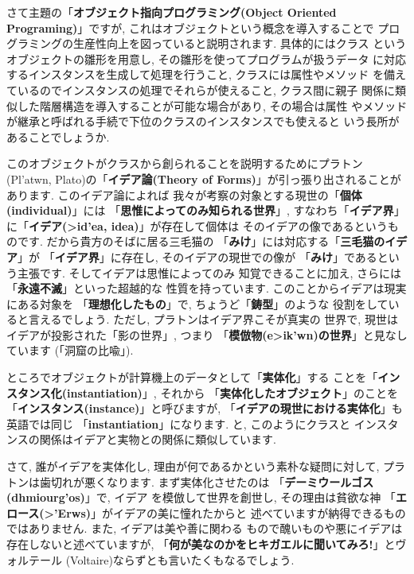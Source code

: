 さて主題の「\textbf{オブジェクト指向プログラミング(Object Oriented
 Programing)}」ですが, これはオブジェクトという概念を導入することで
プログラミングの生産性向上を図っていると説明されます. 具体的にはクラス
というオブジェクトの雛形を用意し, その雛形を使ってプログラムが扱うデータ
に対応するインスタンスを生成して処理を行うこと, クラスには属性やメソッド
を備えているのでインスタンスの処理でそれらが使えること, クラス間に親子
関係に類似した階層構造を導入することが可能な場合があり, その場合は属性
やメソッドが継承と呼ばれる手続で下位のクラスのインスタンスでも使えると
いう長所があることでしょうか.
\newline


このオブジェクトがクラスから創られることを説明するためにプラトン
(\textgreek{Pl'atwn}, Plato)の「\textbf{イデア論(Theory
 of Forms)}」が引っ張り出されることがあります. このイデア論によれば
我々が考察の対象とする現世の「\textbf{個体(individual)}」には
「\textbf{思惟によってのみ知られる世界}」, すなわち「\textbf{イデア界}」
に「\textbf{イデア(\textgreek{>id'ea}, idea)}」が存在して個体は
そのイデアの像であるというものです. だから貴方のそばに居る三毛猫の
「\textbf{みけ}」には対応する「\textbf{三毛猫のイデア}」が
「\textbf{イデア界}」に存在し, そのイデアの現世での像が
「\textbf{みけ}」であるという主張です. そしてイデアは思惟によってのみ
知覚できることに加え, さらには「\textbf{永遠不滅}」といった超越的な
性質を持っています. このことからイデアは現実にある対象を
「\textbf{理想化したもの}」で, ちょうど「\textbf{鋳型}」のような
役割をしていると言えるでしょう. ただし, プラトンはイデア界こそが真実の
世界で, 現世はイデアが投影された「影の世界」, つまり
「\textbf{模倣物(\textgreek{e>ik'wn})の世界}」と見なしています
(「洞窟の比喩」\cite{国家}).
\newline


ところでオブジェクトが計算機上のデータとして「\textbf{実体化}」する
ことを「\textbf{インスタンス化(instantiation)}」, それから
「\textbf{実体化したオブジェクト}」のことを
「\textbf{インスタンス(instance)}」と呼びますが, 
「\textbf{イデアの現世における実体化}」も英語では同じ
「\textbf{instantiation}」になります. と, このようにクラスと
インスタンスの関係はイデアと実物との関係に類似しています. 
\newline

さて, 誰がイデアを実体化し, 理由が何であるかという素朴な疑問に対して,
 プラトンは歯切れが悪くなります. まず実体化させたのは
 「\textbf{デーミウールゴス(\textgreek{dhmiourg'os})}」で, イデア
を模倣して世界を創世し, その理由は貧欲な神
「\textbf{エロース(\textgreek{>'Erws})}」がイデアの美に憧れたからと
述べていますが納得できるものではありません. また, イデアは美や善に関わる
もので醜いものや悪にイデアは存在しないと述べていますが,
 「\textbf{何が美なのかをヒキガエルに聞いてみろ!}」とヴォルテール
(Voltaire)ならずとも言いたくもなるでしょう.
\newline


